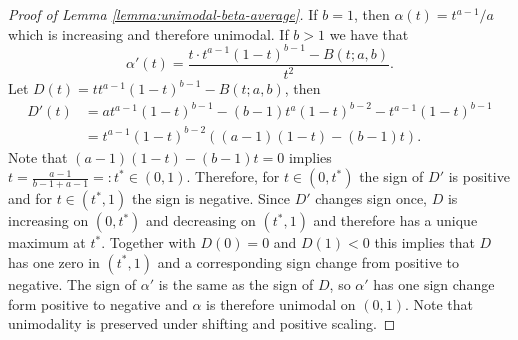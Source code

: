 \documentclass[11pt]{article}
\begin{document}
\begin{proof}[Proof of Lemma \ref{lemma:unimodal-beta-average}]
    If $b=1$, then $\alpha(t)=t^{a-1}/a$ which is increasing and therefore unimodal. If $b>1$ we have that
    $$
    \alpha'(t)=\frac{t\cdot t^{a-1}(1-t)^{b-1}-B(t;a,b)}{t^2}.
    $$
    Let $D(t)=tt^{a-1}(1-t)^{b-1}-B(t;a,b)$, then
    \begin{align*}
        D'(t)&=at^{a-1}(1-t)^{b-1}-(b-1)t^a(1-t)^{b-2}-t^{a-1}(1-t)^{b-1}\\&=t^{a-1}(1-t)^{b-2}\left(\left(a-1\right)\left(1-t\right)-\left(b-1\right)t\right).
    \end{align*}
    Note that $\left(a-1\right)\left(1-t\right)-\left(b-1\right)t=0$ implies $t=\frac{a-1}{b-1+a-1}=:t^*\in(0,1)$. Therefore, for $t\in(0,t^*)$ the sign of $D'$ is positive and for $t\in(t^*,1)$ the sign is negative. 
    Since $D'$ changes sign once, $D$ is increasing on $(0,t^*)$ and decreasing on $(t^*,1)$ and therefore has a unique maximum at $t^*$. Together with $D(0)=0$ and $D(1)<0$ this implies that $D$ has one zero in $(t^*,1)$ and a corresponding sign change from positive to negative. The sign of $\alpha'$ is the same as the sign of $D$, so $\alpha'$ has one sign change form positive to negative and $\alpha$ is therefore unimodal on $(0,1)$. Note that unimodality is preserved under shifting and positive scaling.
\end{proof}

\newpage
\end{document}
